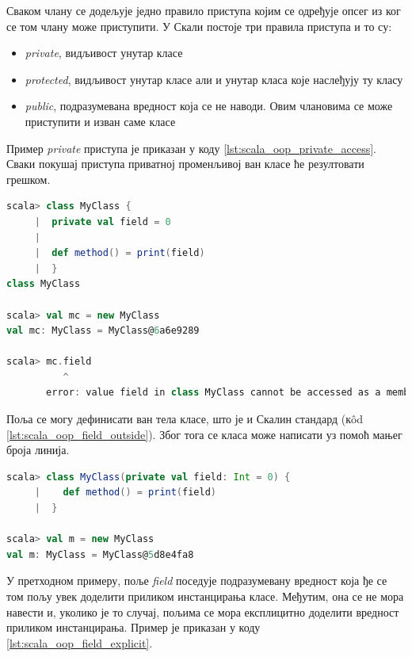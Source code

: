 \documentclass[12pt,oneside]{memoir}
\begin{document}
Сваком члану се додељује једно правило приступа којим се одређује опсег из ког се том члану може приступити. У Скали постоје три правила приступа и то су:

\begin{itemize}
\item \textit{private}, видљивост унутар класе
\item \textit{protected}, видљивост унутар класе али и унутар класа које наслеђују ту класу
\item \textit{public}, подразумевана вредност која се не наводи. Овим члановима се може приступити и изван саме класе
\end{itemize}

Пример \textit{private} приступа је приказан у коду \ref{lst:scala_oop_private_access}. Сваки покушај приступа приватној променљивој ван класе ће резултовати грешком.

\begin{lstlisting}[language=Scala, caption={Пример private правила приступа}, label={lst:scala_oop_private_access}]
scala> class MyClass {
     |  private val field = 0
     |    
     |  def method() = print(field)
     |  }
class MyClass

scala> val mc = new MyClass
val mc: MyClass = MyClass@6a6e9289

scala> mc.field
          ^
       error: value field in class MyClass cannot be accessed as a member of MyClass from class 
\end{lstlisting}

Поља се могу дефинисати ван тела класе, што је и Скалин стандард (к\^ od \ref{lst:scala_oop_field_outside}). Због тога се класа може написати уз помоћ мањег броја линија. 

\begin{lstlisting}[language=Scala, caption={Дефиниција поља ван тела класе}, label={lst:scala_oop_field_outside}]
scala> class MyClass(private val field: Int = 0) {
     |    def method() = print(field)
     |  }

scala> val m = new MyClass
val m: MyClass = MyClass@5d8e4fa8
\end{lstlisting}

У претходном примеру, поље \textit{field} поседује подразумевану вредност која ђе се том пољу увек доделити приликом инстанцирања класе. Међутим, она се не мора навести и, уколико је то случај, пољима се мора експлицитно доделити вредност приликом инстанцирања. Пример је приказан у коду \ref{lst:scala_oop_field_explicit}. \cite{scala_prog}
\end{document}
